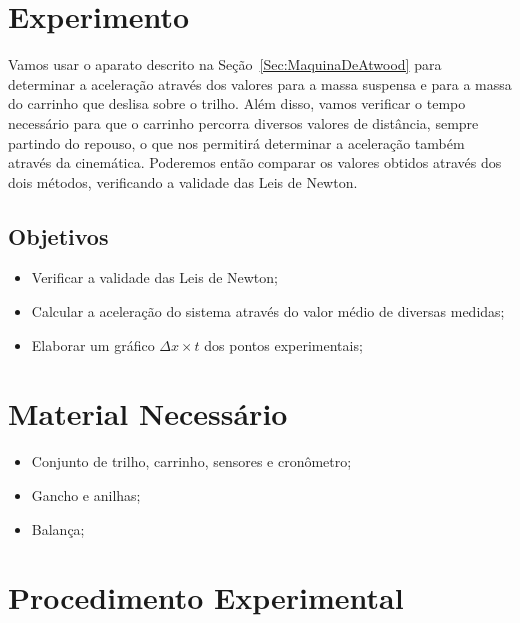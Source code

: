 \section{Experimento}

Vamos usar o aparato descrito na Seção~\ref{Sec:MaquinaDeAtwood} para determinar a aceleração através dos valores para a massa suspensa e para a massa do carrinho que deslisa sobre o trilho. Além disso, vamos verificar o tempo necessário para que o carrinho percorra diversos valores de distância, sempre partindo do repouso, o que nos permitirá determinar a aceleração também através da cinemática. Poderemos então comparar os valores obtidos através dos dois métodos, verificando a validade das Leis de Newton.

\subsection{Objetivos}

\begin{itemize}
     \item Verificar a validade das Leis de Newton;
     \item Calcular a aceleração do sistema através do valor médio de diversas medidas;
     \item Elaborar um gráfico $\Delta x \times t$ dos pontos experimentais;
\end{itemize}

\section{Material Necessário}

\begin{itemize}
	\item Conjunto de trilho, carrinho, sensores e cronômetro;
	\item Gancho e anilhas;
	\item Balança;
\end{itemize}

\section{Procedimento Experimental}

